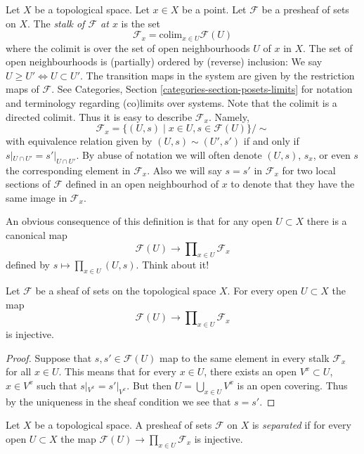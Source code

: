 \noindent
Let $X$ be a topological space. Let $x \in X$ be a point.
Let $\mathcal{F}$ be a presheaf of sets on $X$.
The {\it stalk of $\mathcal{F}$ at $x$} is the set
$$
\mathcal{F}_x
=
\text{colim}_{x\in U} \mathcal{F}(U)
$$
where the colimit is over the set of open neighbourhoods
$U$ of $x$ in $X$. The set of open neighbourhoods is (partially)
ordered by (reverse) inclusion:
We say $U \geq U' \Leftrightarrow U \subset U'$.
The transition maps in the system are
given by the restriction maps of $\mathcal{F}$.
See Categories, Section \ref{categories-section-posets-limits}
for notation and terminology regarding (co)limits over systems.
Note that the colimit is a directed colimit.
Thus it is easy to describe $\mathcal{F}_x$. Namely,
$$
\mathcal{F}_x
=
\{
(U, s)
\mid
x\in U, s\in \mathcal{F}(U)
\}/\sim
$$
with equivalence relation given by $(U, s) \sim (U', s')$
if and only if $s|_{U\cap U'} = s'|_{U\cap U'}$. By abuse of
notation we will often denote $(U, s)$, $s_x$,
or even $s$ the corresponding element in $\mathcal{F}_x$.
Also we will say $s = s'$ in $\mathcal{F}_x$ for two local sections
of $\mathcal{F}$ defined in an open neighbourhod of $x$ to denote that
they have the same image in $\mathcal{F}_x$.

\medskip\noindent
An obvious consequence of this definition is that
for any open $U \subset X$ there is a canonical map
$$
\mathcal{F}(U)
\longrightarrow
\prod\nolimits_{x \in U} \mathcal{F}_x
$$
defined by $s \mapsto \prod_{x \in U} (U, s)$. Think about it!

\begin{lemma}
\label{lemma-sheaf-subset-stalks}
Let $\mathcal{F}$ be a sheaf of sets on the topological space $X$.
For every open $U \subset X$ the map
$$
\mathcal{F}(U)
\longrightarrow
\prod\nolimits_{x \in U} \mathcal{F}_x
$$
is injective.
\end{lemma}

\begin{proof}
Suppose that $s, s' \in \mathcal{F}(U)$ map to the same element
in every stalk $\mathcal{F}_x$ for all $x \in U$. This means that
for every $x \in U$, there exists an open $V^x \subset U$,
$x \in V^x$ such that $s|_{V^x} = s'|_{V^x}$. But then
$U = \bigcup_{x \in U} V^x$ is an open covering. Thus by the
uniqueness in the sheaf condition we see that $s = s'$.
\end{proof}

\begin{definition}
\label{definition-separated}
Let $X$ be a topological space.
A presheaf of sets $\mathcal{F}$ on $X$ is {\it separated}
if for every open $U \subset X$ the map
$\mathcal{F}(U) \to \prod_{x \in U} \mathcal{F}_x$ is
injective.
\end{definition}

